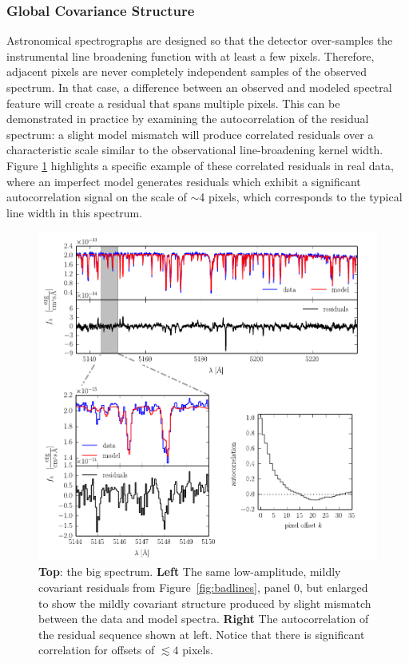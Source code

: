 \documentclass[iop,floatfix]{emulateapj}
\begin{document}
\subsubsection{Global Covariance Structure} \label{subsec:global_covariance}

Astronomical spectrographs are designed so that the detector over-samples the instrumental line 
broadening function with at least a few pixels.  Therefore, adjacent pixels are never completely 
independent samples of the observed spectrum.  In that case, a difference between an observed and 
modeled spectral feature will create a residual that spans multiple pixels.  This can be 
demonstrated in practice by examining the autocorrelation of the residual spectrum: a slight model 
mismatch will produce correlated residuals over a characteristic scale similar to the observational 
line-broadening kernel width.  Figure \ref{fig:class0} highlights a specific example of these 
correlated residuals in real data, where an imperfect model generates residuals which exhibit a 
significant autocorrelation signal on the scale of $\sim$4 pixels, which corresponds to the typical 
line width in this spectrum.  

\begin{figure}[!htb]
\begin{center}
  \includegraphics{correlation_panel.pdf}
  \caption{\textbf{Top}: the big spectrum. \textbf{Left} The same low-amplitude, mildly covariant residuals from Figure~\ref{fig:badlines}, panel 0, but enlarged to show the mildly covariant structure produced by slight mismatch between the data and model spectra.   
  \textbf{Right} The autocorrelation of the residual sequence shown at left. Notice that there is significant correlation for offsets of $\lesssim 4$ pixels.}
\label{fig:class0}
\end{center}
\end{figure}
\end{document}
